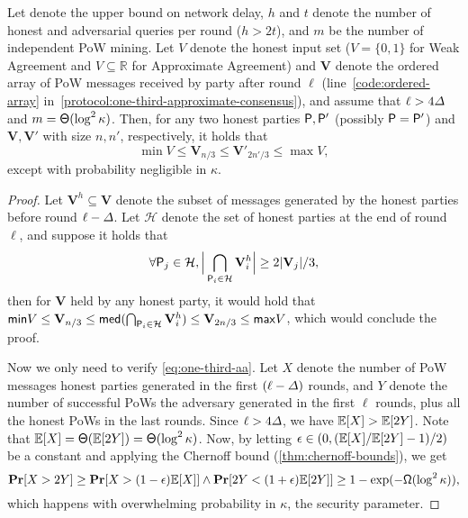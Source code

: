 \begin{lemma} \label{lemma:one-third-apa}
    Let \delay denote the upper bound on network delay, $h$ and $t$ denote the number of honest and adversarial queries per round ($h > 2t$), and $m$ be the number of independent PoW mining.
    Let $V$ denote the honest input set ($V = \{0, 1\}$ for Weak Agreement and $V \subseteq \mathbb{R}$ for Approximate Agreement) and $\mathbf{V}$ denote the ordered array of PoW messages received by party \party after round $\ell$ (line~\ref*{code:ordered-array} in~\cref{protocol:one-third-approximate-consensus}), and assume that $\ell > 4 \varDelta$ and $m = \mathsf{\Theta}(\log^2 \kappa)$.
    Then, for any two honest parties $\mathsf{P}, \mathsf{P}'$ (possibly $\mathsf{P} = \mathsf{P}'$) and $\mathbf{V}, \mathbf{V}'$ with size $n, n'$, respectively, it holds that
    \[ \min V \le \mathbf{V}_{n / 3} \le \mathbf{V}'_{2n' / 3} \le \max V, \]
    except with probability negligible in $\kappa$.
\end{lemma}

\begin{proof}
    Let $\mathbf{V}^h \subseteq \mathbf{V}$ denote the subset of messages generated by the honest parties before round $\ell - \varDelta$.
    Let $\mathcal{H}$ denote the set of honest parties at the end of round $\ell$, and suppose it holds that
    \begin{equation} \label{eq:one-third-aa}
        \forall \mathsf{P}_j \in \mathcal{H}, \Big| \bigcap_{\mathsf{P}_i \in \mathcal{H}} \mathbf{V}^h_i \Big| \ge 2 |\mathbf{V}_j| / 3,
    \end{equation}
    then for $\mathbf{V}$ held by any honest party, it would hold that $\mathsf{min} V \le \mathbf{V}_{n / 3} \le \mathsf{med}(\bigcap_{\mathsf{P}_i \in \mathcal{H}} \mathbf{V}^h_i) \le \mathbf{V}_{2n / 3} \le \mathsf{max} V$, which would conclude the proof.

    Now we only need to verify \cref{eq:one-third-aa}.
    Let $X$ denote the number of PoW messages honest parties generated in the first $(\ell - \varDelta)$ rounds, and $Y$ denote the number of successful PoWs the adversary generated in the first $\ell$ rounds, plus all the honest PoWs in the last \delay rounds.
    Since $\ell > 4 \varDelta$, we have $\mathbb{E}[X] > \mathbb{E}[2Y]$.
    Note that $\mathbb{E}[X] = \mathsf{\Theta}(\mathbb{E}[2Y]) = \mathsf{\Theta}(\log^2 \kappa)$.
    Now, by letting $\epsilon \in (0, (\mathbb{E}[X] / \mathbb{E}[2Y] - 1) / 2 )$ be a constant and applying the Chernoff bound (\cref{thm:chernoff-bounds}), we get
    \[ \mathbf{Pr}[X > 2Y] \ge \mathbf{Pr}[X > (1 - \epsilon) \mathbb{E}[X]] \wedge \mathbf{Pr}[2Y < (1 + \epsilon) \mathbb{E}[2Y]] \ge 1 - \exp(-\mathsf{\Omega}(\log^2 \kappa)), \]
    which happens with overwhelming probability in $\kappa$, the security parameter.
\end{proof}

